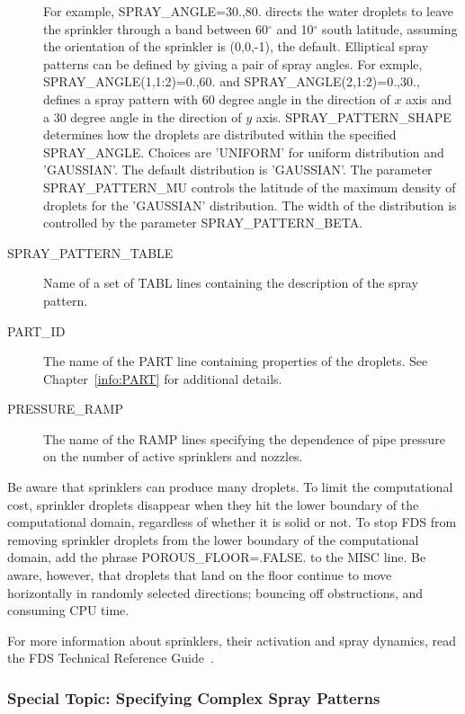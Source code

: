 \documentclass[11pt]{book}
\begin{document}
\begin{description}
For example, {\ct SPRAY\_ANGLE=30.,80.} directs the water droplets to leave
the sprinkler through a band between 60$^\circ$ and 10$^\circ$ south latitude, assuming the orientation of
the sprinkler is (0,0,-1), the default. Elliptical spray patterns can be defined by giving a pair of spray angles. For exmple, {\ct SPRAY\_ANGLE(1,1:2)=0.,60.}  and {\ct SPRAY\_ANGLE(2,1:2)=0.,30.}, defines a spray pattern with 60 degree angle in the direction of $x$ axis and a 30 degree angle in the direction of $y$ axis.
{\ct SPRAY\_PATTERN\_SHAPE} determines how the droplets are distributed within the specified {\ct SPRAY\_ANGLE}.
Choices are {\ct 'UNIFORM'} for uniform distribution and {\ct 'GAUSSIAN'}. The default distribution is {\ct 'GAUSSIAN'}. The parameter {\ct SPRAY\_PATTERN\_MU} controls the latitude of
the maximum density of droplets for the {\ct 'GAUSSIAN'} distribution. The width of the distribution is controlled by the parameter {\ct SPRAY\_PATTERN\_BETA}.
\item[{\ct SPRAY\_PATTERN\_TABLE}] Name of a set of {\ct TABL} lines containing the description of the spray pattern.
\item[{\ct PART\_ID}] The name of the {\ct PART} line containing properties of the droplets.
See Chapter~\ref{info:PART} for additional details.
\item[{\ct PRESSURE\_RAMP}] The name of the {\ct RAMP} lines specifying the dependence of pipe pressure on the
number of active sprinklers and nozzles.
\end{description}

\noindent
Be aware that sprinklers can produce many droplets. To limit the computational cost, sprinkler droplets disappear when they hit the
lower boundary of the computational domain, regardless of whether it is solid
or not. To stop FDS from removing sprinkler droplets from the lower boundary of the computational domain,
add the phrase {\ct POROUS\_FLOOR=.FALSE.} to the {\ct MISC} line. Be aware, however, that
droplets that land on the floor continue to move horizontally in randomly selected
directions; bouncing off obstructions, and consuming CPU time.

For more information about sprinklers, their activation and spray dynamics, read the FDS
Technical Reference Guide~\cite{FDS_Math_Guide}.


\subsubsection{Special Topic: Specifying Complex Spray Patterns}
\label{info:spraypattern}
\label{info:TABL}
\end{document}
